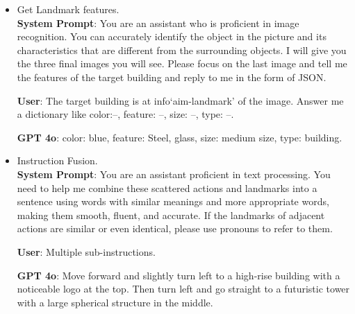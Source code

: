 \begin{itemize}[left=0pt]
    \item Get Landmark features. \\
    \textbf{System Prompt}: You are an assistant who is proficient in image recognition. You can accurately identify the object in the picture and its characteristics that are different from the surrounding objects. I will give you the three final images you will see. Please focus on the last image and tell me the features of the target building and reply to me in the form of JSON.

    \textbf{User}: The target building is at info`aim-landmark' of the image. Answer me a dictionary like color:--, feature: --, size: --, type: --.

    \textbf{GPT 4o}: color: blue, feature: Steel, glass, size: medium size, type: building.

    \item Instruction Fusion. \\
    \textbf{System Prompt}: You are an assistant proficient in text processing. You need to help me combine these scattered actions and landmarks into a sentence using words with similar meanings and more appropriate words, making them smooth, fluent, and accurate. If the landmarks of adjacent actions are similar or even identical, please use pronouns to refer to them.

    \textbf{User}: Multiple sub-instructions.

    \textbf{GPT 4o}: Move forward and slightly turn left to a high-rise building with a noticeable logo at the top. Then turn left and go straight to a futuristic tower with a large spherical structure in the middle.
\end{itemize}

